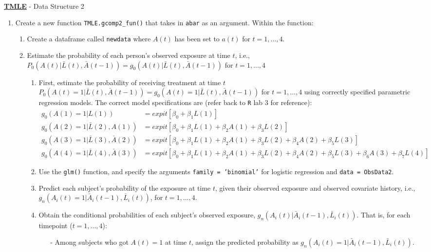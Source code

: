 \documentclass[answers]{exam}
\begin{document}
\noindent \textbf{\underline{TMLE}} - Data Structure 2
\begin{enumerate}
\item Create a new function \texttt{TMLE.gcomp2\_fun()} that takes in \texttt{abar} as an argument. Within the function:
\begin{enumerate}
\item Create a dataframe called \texttt{newdata} where $A(t)$ has been set to $a(t)$ for $t = 1,...,4$.
\item Estimate the probability of each person's observed exposure at time $t$, i.e., $P_0(A(t)|\bar{L}(t), \bar{A}(t-1)) = g_0(A(t)|\bar{L}(t), \bar{A}(t-1))$ for $t = 1,...,4$ 
\begin{enumerate}
\item First, estimate the probability of receiving treatment at time $t$ $P_0(A(t)=1|\bar{L}(t), \bar{A}(t-1)) = g_0(A(t)=1|\bar{L}(t), \bar{A}(t-1))$ for $t = 1,...,4$ using correctly specified parametric regression models. The correct model specifications are (refer back to \texttt{R} lab 3 for reference):
\begin{align*}
g_0(A(1)=1|L(1)) & = expit[\beta_0 + \beta_1L(1)] \\
g_0(A(2)=1|\bar{L}(2), A(1)) & = expit[\beta_0 + \beta_1L(1) + \beta_2A(1) + \beta_3L(2)] \\
g_0(A(3)=1|\bar{L}(3), \bar{A}(2)) & = expit[\beta_0 + \beta_1L(1) + \beta_2A(1) + \beta_3L(2) + \beta_4A(2) + \beta_5L(3)] \\
g_0(A(4)=1|\bar{L}(4), \bar{A}(3)) & = expit[\beta_0 + \beta_1L(1) + \beta_2A(1) + \beta_3L(2) + \beta_4A(2) + \beta_5L(3) + \beta_6A(3) + \beta_7L(4)]
\end{align*}
\item Use the \texttt{glm()} function, and specify the arguments \texttt{family = 'binomial'} for logistic regression and \texttt{data = ObsData2}. 
\item Predict each subject's probability of the exposure at time $t$, given their observed exposure and observed covariate history, i.e., $g_n(A_i(t)=1|\bar{A}_i(t-1), \bar{L}_i(t))$, for $t = 1,...,4$.
\item Obtain the conditional probabilities of each subject's observed exposure, $g_n(A_i(t) | \bar{A}_i(t-1), \bar{L}_i(t))$. That is, for each timepoint ($t = 1,...,4$):
\begin{itemize}
\item[-] Among subjects who got $A(t)=1$ at time $t$, assign the predicted probability as $g_n(A_i(t) = 1| \bar{A}_i(t-1), \bar{L}_i(t))$. 

\end{itemize}
\end{enumerate}
\end{enumerate}
\end{enumerate}
\end{document}
